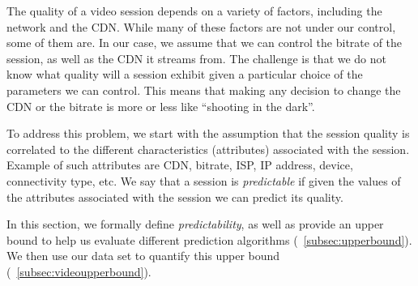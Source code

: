 \label{predictability}


The quality of a video session depends on a variety of factors,
including the network and the CDN. While many of these factors are not
under our control, some of them are. In our case, we assume that we
can control the bitrate of the session, as well as the CDN it streams
from. The challenge is that we do not know what quality will a session
exhibit given a particular choice of the parameters we can
control. This means that making any decision to change the CDN or the
bitrate is more or less like ``shooting in the dark''.

To address this problem, we start with the assumption that the session
quality is correlated to the different characteristics (attributes)
associated with the session. Example of such attributes are CDN,
bitrate, ISP, IP address, device, connectivity type, etc. We say that
a session is {\it predictable} if given the values of the attributes
associated with the session we can predict its quality. 

In this section, we formally define {\it predictability}, as well as
provide an upper bound to help us evaluate different prediction
algorithms (\Section~\ref{subsec:upperbound}). We then use our data
set to quantify this upper bound
(\Section~\ref{subsec:videoupperbound}).





